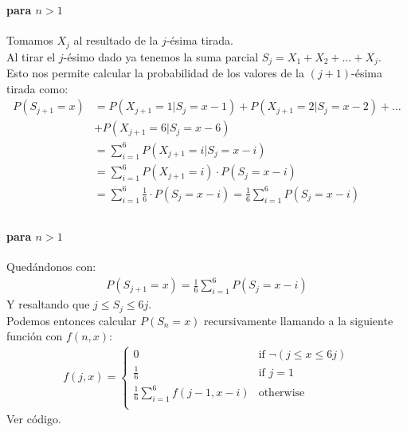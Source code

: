 \documentclass{beamer}
\begin{document}
\begin{frame}
  \frametitle{\SECTIONB}
  \framesubtitle{\EJA para \(n > 1\)}

  Tomamos \(X_{j}\) al resultado de la \(j\)-ésima tirada. \\
  Al tirar el \(j\)-ésimo dado ya tenemos la suma parcial \(S_{j} = X_{1} + X_{2} + \ldots + X_{j}\). \pause \\
  Esto nos permite calcular la probabilidad de los valores de la \((j+1)\)-ésima tirada como:
  {\small
  \begin{align*}
    P(S_{j+1} = x) &= P(X_{j+1} = 1 | S_{j} = x - 1) + P(X_{j+1} = 2 | S_{j} = x - 2) + \ldots \\
                  & + P(X_{j+1} = 6 | S_{j} = x - 6)  \\
                  &= \sum_{i = 1}^{6}P(X_{j+1} = i | S_{j} = x - i) \\
                  &= \sum_{i = 1}^{6}P(X_{j+1} = i) \cdot P(S_{j} = x - i) \\
                  &= \sum_{i = 1}^{6}\frac{1}{6} \cdot P(S_{j} = x - i) = \frac{1}{6}\sum_{i = 1}^{6}P(S_{j} = x - i) \\
  \end{align*}
  }%
\end{frame}

\begin{frame}
  \frametitle{\SECTIONB}
  \framesubtitle{\EJA para \(n > 1\)}

  Quedándonos con:
  \begin{gather*}
    P(S_{j+1} = x) = \frac{1}{6}\sum_{i = 1}^{6}P(S_{j} = x - i)
  \end{gather*}
  Y resaltando que \(j \leq S_{j} \leq 6j\). \\
  Podemos entonces calcular \(P(S_{n} = x)\) recursivamente llamando a la siguiente función con \(f(n, x)\):
  \begin{gather*}
    f(j, x) = \begin{cases}
      0 & \text{if } \neg(j \leq x \leq 6j) \\
      \frac{1}{6} & \text{if } j = 1 \\
      \frac{1}{6}\sum_{i = 1}^{6}f(j-1, x-i) & \text{otherwise} \\
    \end{cases}
  \end{gather*} \pause
  Ver código.
\end{frame}

\newcommand{\EJB}{\href{https://codeforces.com/group/YjFmW2O15Q/contest/101919}{TAP 2018 E, Estacionamiento}}
\end{document}
